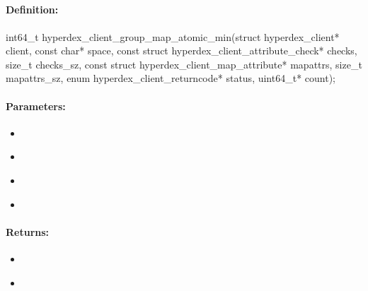 \pagebreak
\subsection{}
\label{api:c:group_map_atomic_min}


\paragraph{Definition:}
\begin{ccode}
int64_t hyperdex_client_group_map_atomic_min(struct hyperdex_client* client,
        const char* space,
        const struct hyperdex_client_attribute_check* checks, size_t checks_sz,
        const struct hyperdex_client_map_attribute* mapattrs, size_t mapattrs_sz,
        enum hyperdex_client_returncode* status,
        uint64_t* count);
\end{ccode}

\paragraph{Parameters:}
\begin{itemize}[noitemsep]
\item {}\\

\item {}\\

\item {}\\

\item {}\\

\end{itemize}

\paragraph{Returns:}
\begin{itemize}[noitemsep]
\item {}\\

\item {}\\

\end{itemize}

